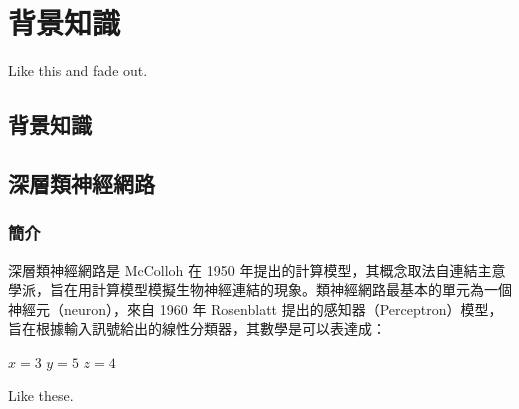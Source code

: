 \chapter{背景知識}
Like this \cite{726791, baevski2020wav2vec} and fade out.

\section{背景知識}

\section{深層類神經網路}

\subsection{簡介}

深層類神經網路是 McColloh 在 1950 年提出的計算模型，其概念取法自連結主意學派，旨在用計算模型模擬生物神經連結的現象。類神經網路最基本的單元為一個神經元（neuron），來自 1960 年 Rosenblatt 提出的感知器（Perceptron）模型，旨在根據輸入訊號給出的線性分類器，其數學是可以表達成：

$ x = 3 $
\( y = 5 \)
\( z = 4 \)

Like these.

